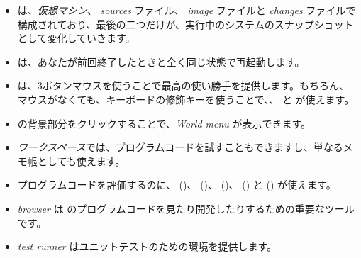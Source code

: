 \documentclass[a4paper,10pt,twoside]{book}
\begin{document}
\begin{itemize}
  \item \pharo は、\emph{仮想マシン}、 \emph{sources} ファイル、 \emph{image} ファイルと \emph{changes} ファイルで構成されており、最後の二つだけが、実行中のシステムのスナップショットとして変化していきます。
  \item \pharo は、あなたが前回終了したときと全く同じ状態で再起動します。
  \item \pharo は、3ボタンマウスを使うことで最高の使い勝手を提供します。もちろん、マウスがなくても、キーボードの修飾キーを使うことで、\click 、 \actclick と \metaclick が使えます。
  \item \pharo の背景部分をクリックすることで、\emph{World menu} が表示できます。
  \item \emph{ワークスペース}では、プログラムコードを試すこともできますし、単なるメモ帳としても使えます。
  \item プログラムコードを評価するのに、 ()、  ()、  ()、  () と  () が使えます。
  \item \emph{browser} は \pharo のプログラムコードを見たり開発したりするための重要なツールです。
  \item \emph{test runner} はユニットテストのための環境を提供します。
\end{itemize}

\ifx\wholebook\relax\else 
   
   
\end{document}
